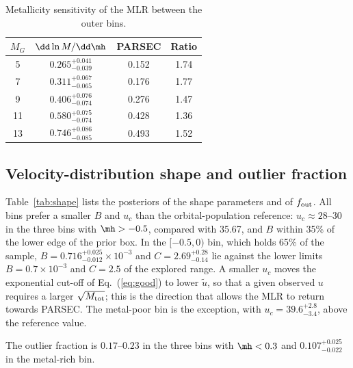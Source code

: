 \begin{table}
\caption{Metallicity sensitivity of the MLR between the outer bins.}
\label{tab:slope}
\centering
\begin{tabular}{@{}cccc@{}}
\toprule
$M_G$ & $\dd\ln M/\dd\mh$ & PARSEC & Ratio \\
\midrule
5  & $0.265^{+0.041}_{-0.039}$ & 0.152 & 1.74 \\
7  & $0.311^{+0.067}_{-0.065}$ & 0.176 & 1.77 \\
9  & $0.406^{+0.076}_{-0.074}$ & 0.276 & 1.47 \\
11 & $0.580^{+0.075}_{-0.074}$ & 0.428 & 1.36 \\
13 & $0.746^{+0.086}_{-0.085}$ & 0.493 & 1.52 \\
\bottomrule
\end{tabular}
\end{table}

\subsection{Velocity-distribution shape and outlier fraction}
\label{sec:shape}

Table~\ref{tab:shape} lists the posteriors of the shape parameters and of
$f_{\rm out}$.  All bins prefer a smaller $B$ and $u_c$ than the
orbital-population reference: $u_c\approx28$--$30$ in the three bins with
$\mh>-0.5$, compared with 35.67, and $B$ within 35\% of the lower edge of the
prior box.  In the $[-0.5,0)$ bin, which holds 65\% of the sample,
$B=0.716^{+0.025}_{-0.012}\times10^{-3}$ and $C=2.69^{+0.28}_{-0.14}$ lie
against the lower limits $B=0.7\times10^{-3}$ and $C=2.5$ of the explored
range.  A smaller $u_c$ moves the exponential cut-off of
Eq.~(\ref{eq:good}) to lower $\tilde u$, so that a given observed $u$
requires a larger $\sqrt{M_{\rm tot}}$; this is the direction that allows the
MLR to return towards PARSEC.  The metal-poor bin is the exception, with
$u_c=39.6^{+2.8}_{-3.4}$, above the reference value.

The outlier fraction is $0.17$--$0.23$ in the three bins with $\mh<0.3$
and $0.107^{+0.025}_{-0.022}$ in the metal-rich bin.

